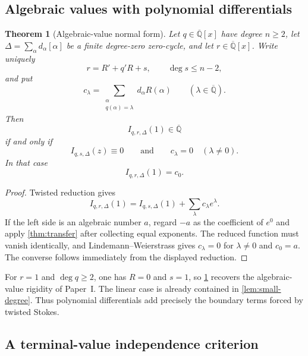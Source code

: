 \documentclass[11pt]{article}
\numberwithin{equation}{section}
\newtheorem{theorem}{Theorem}[section]
\theoremstyle{definition}
\theoremstyle{remark}
\newcommand{\Qbar}{\overline{\mathbb Q}}
\begin{document}
\subsection{Algebraic values with polynomial differentials}

\begin{theorem}[Algebraic-value normal form]
\label{thm:algebraic-value-normal-form}
Let $q\in\Qbar[x]$ have degree $n\ge2$, let
$\Delta=\sum_\alpha d_\alpha[\alpha]$ be a finite degree-zero zero-cycle,
and let $r\in\Qbar[x]$.  Write uniquely
\[
  r=R'+q'R+s,
  \qquad \deg s\le n-2,
\]
and put
\[
  c_\lambda
  =\sum_{\substack{\alpha\\q(\alpha)=\lambda}}
    d_\alpha R(\alpha)
  \qquad(\lambda\in\Qbar).
\]
Then
\[
  I_{q,r,\Delta}(1)\in\Qbar
\]
if and only if
\begin{equation}\label{eq:normal-form-conditions}
  I_{q,s,\Delta}(z)\equiv0
  \qquad\text{and}\qquad
  c_\lambda=0\quad(\lambda\ne0).
\end{equation}
In that case
\begin{equation}\label{eq:normal-form-value}
  I_{q,r,\Delta}(1)=c_0.
\end{equation}
\end{theorem}

\begin{proof}
Twisted reduction gives
\[
  I_{q,r,\Delta}(1)
  =I_{q,s,\Delta}(1)+\sum_\lambda c_\lambda e^\lambda.
\]
If the left side is an algebraic number $a$, regard $-a$ as the coefficient
of $e^0$ and apply \cref{thm:transfer} after collecting equal exponents.
The reduced function must vanish identically, and
Lindemann--Weierstrass gives $c_\lambda=0$ for $\lambda\ne0$ and
$c_0=a$.  The converse follows immediately from the displayed reduction.
\end{proof}

For $r=1$ and $\deg q\ge2$, one has $R=0$ and $s=1$, so
\cref{thm:algebraic-value-normal-form} recovers the algebraic-value rigidity
of Paper~I.  The linear case is already contained in
\cref{lem:small-degree}.  Thus polynomial differentials add precisely the
boundary terms forced by twisted Stokes.

\subsection{A terminal-value independence criterion}
\end{document}
